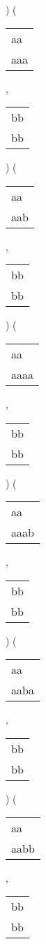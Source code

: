 ) 
 ( 
\begin{tabular}{|l|} \hline
aa\  \\
aaa \\
\hline
\end{tabular} 
 , 
\begin{tabular}{|l|} \hline
bb \\
bb \\
\hline
\end{tabular} 
) 
 ( 
\begin{tabular}{|l|} \hline
aa\  \\
aab \\
\hline
\end{tabular} 
 , 
\begin{tabular}{|l|} \hline
bb \\
bb \\
\hline
\end{tabular} 
) 
 ( 
\begin{tabular}{|l|} \hline
aa\ \  \\
aaaa \\
\hline
\end{tabular} 
 , 
\begin{tabular}{|l|} \hline
bb \\
bb \\
\hline
\end{tabular} 
) 
 ( 
\begin{tabular}{|l|} \hline
aa\ \  \\
aaab \\
\hline
\end{tabular} 
 , 
\begin{tabular}{|l|} \hline
bb \\
bb \\
\hline
\end{tabular} 
) 
 ( 
\begin{tabular}{|l|} \hline
aa\ \  \\
aaba \\
\hline
\end{tabular} 
 , 
\begin{tabular}{|l|} \hline
bb \\
bb \\
\hline
\end{tabular} 
) 
 ( 
\begin{tabular}{|l|} \hline
aa\ \  \\
aabb \\
\hline
\end{tabular} 
 , 
\begin{tabular}{|l|} \hline
bb \\
bb \\
\hline
\end{tabular} 
